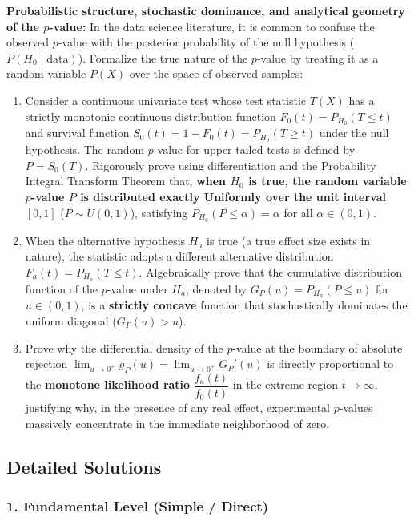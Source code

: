 \begin{problema}
	\label{prob:doc_desaf_pvalor_teorema}
	\textbf{Probabilistic structure, stochastic dominance, and analytical geometry of the $p$-value:}
	In the data science literature, it is common to confuse the observed $p$-value with the posterior probability of the null hypothesis ($P(H_0 \mid \text{data})$). Formalize the true nature of the $p$-value by treating it as a random variable $P(X)$ over the space of observed samples:
	\begin{enumerate}
		\item Consider a continuous univariate test whose test statistic $T(X)$ has a strictly monotonic continuous distribution function $F_0(t) = P_{H_0}(T \le t)$ and survival function $S_0(t) = 1 - F_0(t) = P_{H_0}(T \ge t)$ under the null hypothesis. The random $p$-value for upper-tailed tests is defined by $P = S_0(T)$.
		Rigorously prove using differentiation and the Probability Integral Transform Theorem that, \textbf{when $H_0$ is true, the random variable $p$-value $P$ is distributed exactly Uniformly over the unit interval $[0, 1]$} ($P \sim U(0,1)$), satisfying $P_{H_0}(P \le \alpha) = \alpha$ for all $\alpha \in (0,1)$.
		\item When the alternative hypothesis $H_a$ is true (a true effect size exists in nature), the statistic adopts a different alternative distribution $F_a(t) = P_{H_a}(T \le t)$. Algebraically prove that the cumulative distribution function of the $p$-value under $H_a$, denoted by $G_P(u) = P_{H_a}(P \le u)$ for $u \in (0,1)$, is a \textbf{strictly concave} function that stochastically dominates the uniform diagonal ($G_P(u) > u$).
		\item Prove why the differential density of the $p$-value at the boundary of absolute rejection $\lim_{u \to 0^+} g_P(u) = \lim_{u \to 0^+} G_P'(u)$ is directly proportional to the \textbf{monotone likelihood ratio} $\dfrac{f_a(t)}{f_0(t)}$ in the extreme region $t \to \infty$, justifying why, in the presence of any real effect, experimental $p$-values massively concentrate in the immediate neighborhood of zero.
	\end{enumerate}
\end{problema}


\subsection{Detailed Solutions}

\subsubsection*{1. Fundamental Level (Simple / Direct)}

